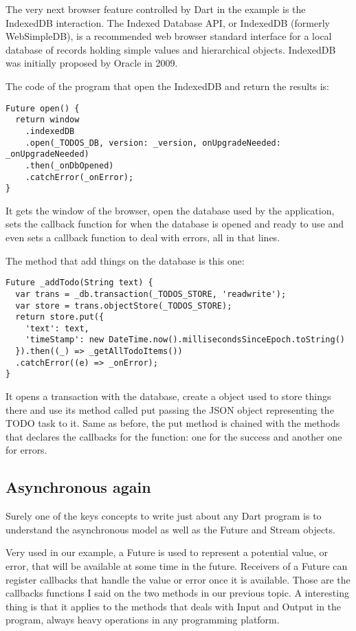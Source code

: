 The very next browser feature controlled by Dart in the example is the
IndexedDB \cite{4_10} interaction. The Indexed
Database API, or IndexedDB (formerly  WebSimpleDB), is a recommended web browser
standard interface for a local database of records holding simple values and
hierarchical objects. IndexedDB was initially proposed by Oracle in 2009.

The code of the program that open the IndexedDB and return the results is:

\begin{lstlisting}[label=dffexp,caption=Dart open's IndexedDB and return results]
Future open() {
  return window
    .indexedDB
    .open(_TODOS_DB, version: _version, onUpgradeNeeded: _onUpgradeNeeded)
    .then(_onDbOpened)
    .catchError(_onError);
}
\end{lstlisting}

It gets the window of the browser, open the database used by the application,
sets the callback function for when the database is opened and ready to use and
even sets a callback function to deal with errors, all in that lines.

The method that add things on the database is this one:

\begin{lstlisting}[label=dpoint,caption=Dart stores stuff]
Future _addTodo(String text) {
  var trans = _db.transaction(_TODOS_STORE, 'readwrite');
  var store = trans.objectStore(_TODOS_STORE);
  return store.put({
    'text': text,
    'timeStamp': new DateTime.now().millisecondsSinceEpoch.toString()
  }).then((_) => _getAllTodoItems())
  .catchError((e) => _onError);
}
\end{lstlisting}

It opens a transaction \cite{4_11} with the
database, create a object used to store things there and use its method called
put passing the JSON object representing the TODO task to it. Same as before,
the put method is chained with the methods that declares the callbacks for the
function: one for the success and another one for errors.

\subsection{Asynchronous again}

Surely one of the keys concepts to write just about any Dart program is to
understand the asynchronous model as well as the
Future \cite{4_12} and
Stream \cite{4_13} objects.

Very used in our example, a Future is used to represent a potential value, or
error, that will be available at some time in the future. Receivers of a Future
can register callbacks that handle the value or error once it is available.
Those are the callbacks functions I said on the two methods in our previous
topic. A interesting thing is that it applies to the methods that deals with
Input and Output in the program, always heavy operations in any programming
platform.